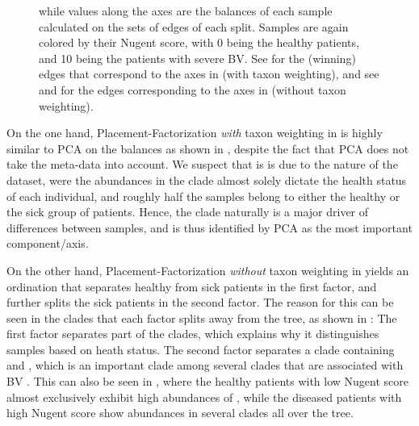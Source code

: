 \begin{figure}[!htb]
{        while values along the axes are the balances of each sample calculated on the sets of edges of each split.
        Samples are again colored by their Nugent score, with \num{0} being the healthy patients,
        and \num{10} being the patients with severe \ac{BV}.
        See  for the (winning) edges that correspond to the axes
        in  (with taxon weighting),
        and see  and 
        for the edges corresponding to the axes in 
        (without taxon weighting).
    }
    \label{fig:pf_bv_place_ilr_ordination}
\end{figure}

On the one hand, Placement-Factorization \emph{with} taxon weighting
in 
is highly similar to PCA on the balances
as shown in ,
despite the fact that PCA does not take the meta-data into account.
We suspect that is is due to the nature of the dataset,
were the abundances in the  clade almost solely dictate the health status of each individual,
and roughly half the samples belong to either the healthy or the sick group of patients.
Hence, the  clade naturally is a major driver of differences between samples,
and is thus identified by PCA as the most important component/axis.

On the other hand, Placement-Factorization \emph{without} taxon weighting
in  yields an ordination
that separates healthy from sick patients in the first factor,
and further splits the sick patients in the second factor.
The reason for this can be seen in the clades that each factor splits away from the tree,
as shown in :
The first factor separates part of the  clades,
which explains why it distinguishes samples based on heath status.
The second factor separates a clade containing  and ,
which is an important clade among several clades that are associated with \ac{BV} \cite{Srinivasan2012}.
This can also be seen in ,
where the healthy patients with low Nugent score
almost exclusively exhibit high abundances of ,
while the diseased patients with high Nugent score show abundances in several clades all over the tree.

